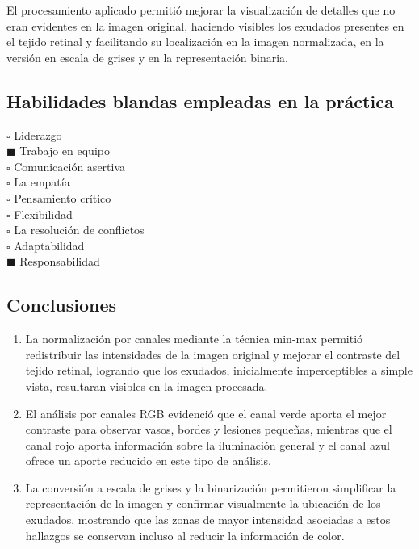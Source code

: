 \documentclass[11pt]{article}
\begin{document}
El procesamiento aplicado permitió mejorar la visualización de detalles que no eran evidentes en la imagen original, haciendo visibles los exudados presentes en el tejido retinal y facilitando su localización en la imagen normalizada, en la versión en escala de grises y en la representación binaria.

\subsection{Habilidades blandas empleadas en la práctica}
$\square$ Liderazgo \\
$\blacksquare$ Trabajo en equipo \\
$\square$ Comunicación asertiva \\
$\square$ La empatía \\
$\square$ Pensamiento crítico \\
$\square$ Flexibilidad \\
$\square$ La resolución de conflictos \\
$\square$ Adaptabilidad \\
$\blacksquare$ Responsabilidad \\

\subsection{Conclusiones}
\begin{enumerate}
    \item La normalización por canales mediante la técnica min-max permitió redistribuir las intensidades de la imagen original y mejorar el contraste del tejido retinal, logrando que los exudados, inicialmente imperceptibles a simple vista, resultaran visibles en la imagen procesada.

    \item El análisis por canales RGB evidenció que el canal verde aporta el mejor contraste para observar vasos, bordes y lesiones pequeñas, mientras que el canal rojo aporta información sobre la iluminación general y el canal azul ofrece un aporte reducido en este tipo de análisis.

    \item La conversión a escala de grises y la binarización permitieron simplificar la representación de la imagen y confirmar visualmente la ubicación de los exudados, mostrando que las zonas de mayor intensidad asociadas a estos hallazgos se conservan incluso al reducir la información de color.
\end{enumerate}
\end{document}
